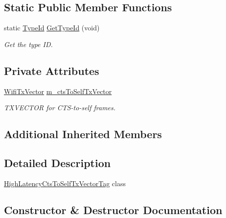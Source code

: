 \subsection*{Static Public Member Functions}
\begin{DoxyCompactItemize}
\item 
static \hyperlink{classns3_1_1TypeId}{Type\+Id} \hyperlink{classns3_1_1HighLatencyCtsToSelfTxVectorTag_a46addba2d7d06460e6121344c42d97d4}{Get\+Type\+Id} (void)
\begin{DoxyCompactList}\small\item\em Get the type ID. \end{DoxyCompactList}\end{DoxyCompactItemize}
\subsection*{Private Attributes}
\begin{DoxyCompactItemize}
\item 
\hyperlink{classns3_1_1WifiTxVector}{Wifi\+Tx\+Vector} \hyperlink{classns3_1_1HighLatencyCtsToSelfTxVectorTag_a7ee08673e8112832c102c46adf9dadd2}{m\+\_\+cts\+To\+Self\+Tx\+Vector}
\begin{DoxyCompactList}\small\item\em T\+X\+V\+E\+C\+T\+OR for C\+T\+S-\/to-\/self frames. \end{DoxyCompactList}\end{DoxyCompactItemize}
\subsection*{Additional Inherited Members}


\subsection{Detailed Description}
\hyperlink{classns3_1_1HighLatencyCtsToSelfTxVectorTag}{High\+Latency\+Cts\+To\+Self\+Tx\+Vector\+Tag} class 

\subsection{Constructor \& Destructor Documentation}
